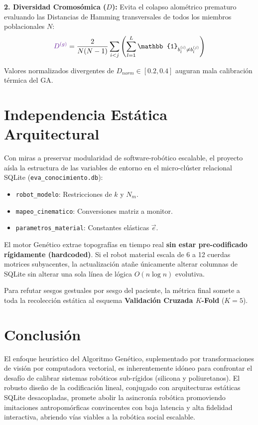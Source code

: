 \documentclass[11pt, a4paper, twocolumn]{article}
\begin{document}
\noindent\textbf{2. Diversidad Cromosómica ($D$):} Evita el colapso alométrico prematuro evaluando las Distancias de Hamming transversales de todos los miembros poblacionales $N$:
$$
\textcolor{corepurple}{D^{(g)}} = \frac{2}{N(N-1)} \sum_{i<j} \left( \sum_{l=1}^{L} \mathbb{1}_{b_l^{(i)} \neq b_l^{(j)}} \right) 
$$

Valores normalizados divergentes de $D_{norm} \in [0.2, 0.4]$ auguran mala calibración térmica del GA.

\section{Independencia Estática Arquitectural}
Con miras a preservar modularidad de software-robótico escalable, el proyecto aísla la estructura de las variables de entorno en el micro-clúster relacional SQLite (\texttt{eva\_conocimiento.db}):

\begin{itemize}
    \item \texttt{robot\_modelo}: Restricciones de $k$ y $N_m$.
    \item \texttt{mapeo\_cinematico}: Conversiones matriz a monitor.
    \item \texttt{parametros\_material}: Constantes elásticas $\vec{e}$.
\end{itemize}

El motor Genético extrae topografías en tiempo real \textbf{sin estar pre-codificado rígidamente (hardcoded)}. Si el robot material escala de 6 a 12 cuerdas motrices subyacentes, la actualización atañe únicamente alterar columnas de SQLite sin alterar una sola línea de lógica $O(n\log n)$ evolutiva. 

Para refutar sesgos gestuales por sesgo del paciente, la métrica final somete a toda la recolección estática al esquema \textbf{Validación Cruzada $K$-Fold} ($K=5$). 

\section{Conclusión}
El enfoque heurístico del Algoritmo Genético, suplementado por transformaciones de visión por computadora vectorial, es inherentemente idóneo para confrontar el desafío de calibrar sistemas robóticos sub-rígidos (silicona y poliuretanos). El robusto diseño de la codificación lineal, conjugado con arquitecturas estáticas SQLite desacopladas, promete abolir la asincronía robótica promoviendo imitaciones antropomórficas convincentes con baja latencia y alta fidelidad interactiva, abriendo vías viables a la robótica social escalable.
\end{document}
